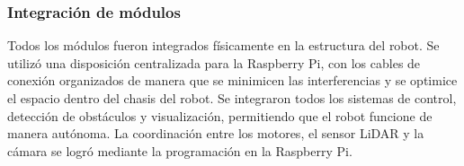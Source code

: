     \subsubsection{Integraci\'on de m\'odulos}
    Todos los m\'odulos fueron integrados f\'isicamente en la estructura del robot. Se utiliz\'o
        una disposici\'on centralizada para la Raspberry Pi, con los cables de conexi\'on
        organizados de manera que se minimicen las interferencias y se optimice el espacio
        dentro del chasis del robot.
    \vskip 0.5cm
    Se integraron todos los sistemas de control, detecci\'on de obst\'aculos y visualizaci\'on,
        permitiendo que el robot funcione de manera aut\'onoma. La coordinaci\'on entre los
        motores, el sensor LiDAR y la c\'amara se logr\'o mediante la programaci\'on en la
        Raspberry Pi.
    \vskip 0.5cm
